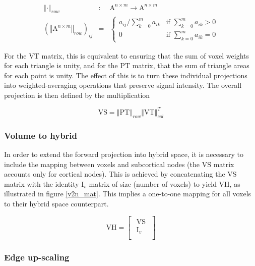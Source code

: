 \documentclass[12pt]{report}
\newcommand{\mat}[1]{\mathrm{#1}}
\begin{document}
\begin{eqnarray}
\left\Vert \cdot \right\Vert_{row} &:& \mathrm{A}^{n \times m} \rightarrow \mathrm{A}^{n \times m} \nonumber \\
(\left\Vert \mathrm{A}^{n \times m} \right\Vert_{row})_{ij} &=&
\begin{cases}
a_{ij} / \sum^m_{k=0} a_{ik} & \text{if } \sum^m_{k=0} a_{ik} > 0 \\ 
0 & \text{if } \sum^m_{k=0} a_{ik} = 0 
\end{cases}
\end{eqnarray}

For the $\mat{VT}$ matrix, this is equivalent to ensuring that the sum of voxel weights for each triangle is unity, and for the $\mat{PT}$ matrix, that the sum of triangle areas for each point is unity. The effect of this is to turn these individual projections into weighted-averaging operations that preserve signal intensity. The overall projection is then defined by the multiplication

\begin{equation}
\mathrm{VS} = \left\Vert\mathrm{PT}\right\Vert_{row} \left\Vert \mathrm{VT} \right\Vert_{col}^T
\end{equation}

\subsubsection{Volume to hybrid}

In order to extend the forward projection into hybrid space, it is necessary to include the mapping between voxels and subcortical nodes (the $\mat{VS}$ matrix accounts only for cortical nodes). This is achieved by concatenating the $\mat{VS}$ matrix with the identity $\mat{I}_v$ matrix of size (number of voxels) to yield $\mat{VH}$, as illustrated in figure \ref{v2n_mat}. This implies a one-to-one mapping for all voxels to their hybrid space counterpart. 

\begin{equation}
\mathrm{VH} =  \begin{bmatrix}
    \begin{array}{c}
  \mathrm{VS}  \\
  \hline
  \mathrm{I}_v \\
    \end{array}
  \end{bmatrix}
\end{equation}

\subsubsection{Edge up-scaling}
\end{document}
